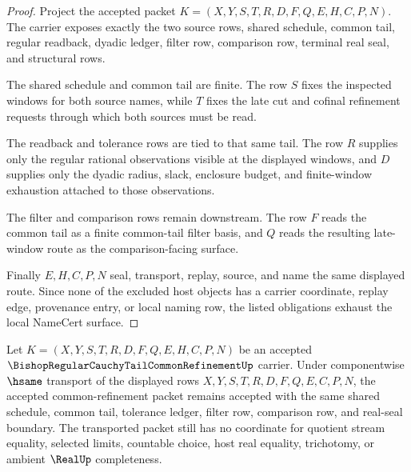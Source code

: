 \begin{proof}
Project the accepted packet $K=(X,Y,S,T,R,D,F,Q,E,H,C,P,N)$. The carrier exposes exactly the two source rows, shared schedule, common tail, regular readback, dyadic ledger, filter row, comparison row, terminal real seal, and structural rows.

The shared schedule and common tail are finite. The row $S$ fixes the inspected windows for both source names, while $T$ fixes the late cut and cofinal refinement requests through which both sources must be read.

The readback and tolerance rows are tied to that same tail. The row $R$ supplies only the regular rational observations visible at the displayed windows, and $D$ supplies only the dyadic radius, slack, enclosure budget, and finite-window exhaustion attached to those observations.

The filter and comparison rows remain downstream. The row $F$ reads the common tail as a finite common-tail filter basis, and $Q$ reads the resulting late-window route as the comparison-facing surface.

Finally $E,H,C,P,N$ seal, transport, replay, source, and name the same displayed route. Since none of the excluded host objects has a carrier coordinate, replay edge, provenance entry, or local naming row, the listed obligations exhaust the local NameCert surface.
\end{proof}

\begin{theorem}
\label{thm:bishop-regular-cauchy-tail-common-refinement-stability}
Let $K=(X,Y,S,T,R,D,F,Q,E,H,C,P,N)$ be an accepted $\BishopRegularCauchyTailCommonRefinementUp$ carrier. Under componentwise $\hsame$ transport of the displayed rows $X,Y,S,T,R,D,F,Q,E,C,P,N$, the accepted common-refinement packet remains accepted with the same shared schedule, common tail, tolerance ledger, filter row, comparison row, and real-seal boundary. The transported packet still has no coordinate for quotient stream equality, selected limits, countable choice, host real equality, trichotomy, or ambient $\RealUp$ completeness.
\end{theorem}

